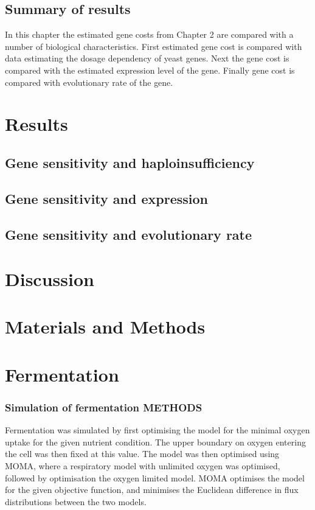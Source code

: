 \subsection{Summary of results}

In this chapter the estimated gene costs from Chapter 2 are compared with a number of biological characteristics. First estimated gene cost is compared with data estimating the dosage dependency of yeast genes. Next the gene cost is compared with the estimated expression level of the gene. Finally gene cost is compared with evolutionary rate of the gene.

\section{Results}

\subsection{Gene sensitivity and haploinsufficiency}

\subsection{Gene sensitivity and expression}

\subsection{Gene sensitivity and evolutionary rate}

\section{Discussion}

\section{Materials and Methods}

\section*{Fermentation}

\subsubsection*{Simulation of fermentation METHODS}

Fermentation was simulated by first optimising the model for the minimal oxygen uptake for the given nutrient condition. The upper boundary on oxygen entering the cell was then fixed at this value. The model was then optimised using MOMA, where a respiratory model with unlimited oxygen was optimised, followed by optimisation the oxygen limited model. MOMA optimises the model for the given objective function, and minimises the Euclidean difference in flux distributions between the two models.

